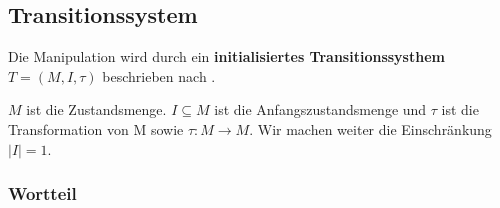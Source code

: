 \documentclass[]{article}
\begin{document}






\subsection{Transitionssystem}


Die Manipulation wird durch ein \textbf{initialisiertes Transitionssysthem $T=(M,I,\tau)$} beschrieben nach \cite{Glausch}.

$M$ ist die Zustandsmenge. $I\subseteq M$ ist die Anfangszustandsmenge und $\tau$ ist die Transformation von M sowie $\tau: M \rightarrow M$. Wir machen weiter die Einschränkung $|I|=1$.


% 

\subsubsection*{Wortteil}
\end{document}
